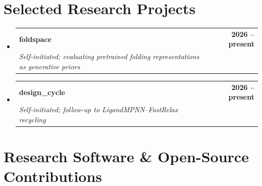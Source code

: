 \documentclass[letterpaper,11pt]{article}
\makeatletter
\newcommand{\resumeSubheading}[4]{
\vspace{-2pt}\item
\begin{tabular*}{1.0\textwidth}[t]{l@{\extracolsep{\fill}}r}
\textbf{#1} & \textbf{\small #2} \\
\textit{\small#3} & \textit{\small #4} \\
\end{tabular*}\vspace{-7pt}
}
\newcommand{\resumeSubHeadingListStart}{\begin{itemize}[leftmargin=0.0in, label={}]}
\newcommand{\resumeSubHeadingListEnd}{\end{itemize}}
\makeatother
\begin{document}
\section{Selected Research Projects}
\resumeSubHeadingListStart
\resumeSubheading{foldspace}{2026 -- present}{Self-initiated; evaluating pretrained folding representations as generative priors}{}
\resumeSubheading{design\_cycle}{2026 -- present}{Self-initiated; follow-up to LigandMPNN--FastRelax recycling}{}
\resumeSubHeadingListEnd


\section{Research Software \& Open-Source Contributions}
\end{document}
